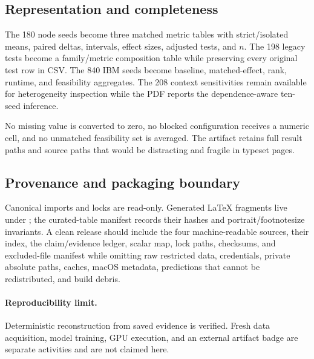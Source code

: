 \subsection{Representation and completeness}

The 180 node seeds become three matched metric tables with strict/isolated means, paired deltas, intervals, effect sizes, adjusted tests, and \(n\). The 198 legacy tests become a family/metric composition table while preserving every original test row in CSV. The 840 IBM seeds become baseline, matched-effect, rank, runtime, and feasibility aggregates. The 208 context sensitivities remain available for heterogeneity inspection while the PDF reports the dependence-aware ten-seed inference.

No missing value is converted to zero, no blocked configuration receives a numeric cell, and no unmatched feasibility set is averaged. The artifact retains full result paths and source paths that would be distracting and fragile in typeset pages.

\subsection{Provenance and packaging boundary}

Canonical imports and locks are read-only. Generated LaTeX fragments live under ; the curated-table manifest records their hashes and portrait/footnotesize invariants. A clean release should include the four machine-readable sources, their index, the claim/evidence ledger, scalar map, lock paths, checksums, and excluded-file manifest while omitting raw restricted data, credentials, private absolute paths, caches, macOS metadata, predictions that cannot be redistributed, and build debris.

\paragraph{Reproducibility limit.}
Deterministic reconstruction from saved evidence is verified. Fresh data acquisition, model training, GPU execution, and an external artifact badge are separate activities and are not claimed here.

